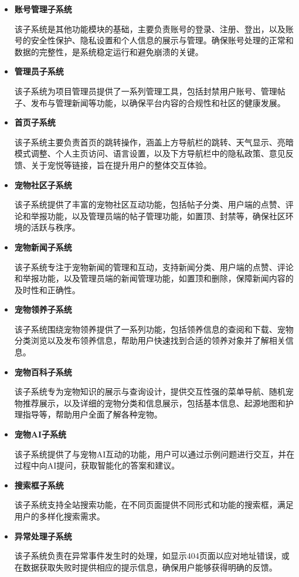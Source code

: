 \begin{itemize}
	\item \textbf{账号管理子系统}

	该子系统是其他功能模块的基础，主要负责账号的登录、注册、登出，以及账号的安全性保护、隐私设置和个人信息的展示与管理。确保账号处理的正常和数据的完整性，是系统稳定运行和避免崩溃的关键。

	\item \textbf{管理员子系统}

	该子系统为项目管理员提供了一系列管理工具，包括封禁用户账号、管理帖子、发布与管理新闻等功能，以确保平台内容的合规性和社区的健康发展。

	\item \textbf{首页子系统}

	该子系统主要负责首页的跳转操作，涵盖上方导航栏的跳转、天气显示、亮暗模式调整、个人主页访问、语言设置，以及下方导航栏中的隐私政策、意见反馈、关于宠悦等链接，旨在提升用户的整体交互体验。

	\item \textbf{宠物社区子系统}

	该子系统提供了丰富的宠物社区互动功能，包括帖子分类、用户端的点赞、评论和举报功能，以及管理员端的帖子管理功能，如置顶、封禁等，确保社区环境的活跃与秩序。

	\item \textbf{宠物新闻子系统}

	该子系统专注于宠物新闻的管理和互动，支持新闻分类、用户端的点赞、评论和举报功能，以及管理员端的新闻管理功能，如置顶和删除，保障新闻内容的及时性和正确性。

	\item \textbf{宠物领养子系统}

	该子系统围绕宠物领养提供了一系列功能，包括领养信息的查阅和下载、宠物分类浏览以及发布领养信息，帮助用户快速找到合适的领养对象并了解相关信息。

	\item \textbf{宠物百科子系统}

	该子系统专为宠物知识的展示与查询设计，提供交互性强的菜单导航、随机宠物推荐展示，以及详细的宠物分类和信息展示，包括基本信息、起源地图和护理指导等，帮助用户全面了解各种宠物。

	\item \textbf{宠物AI子系统}

	该子系统提供了与宠物AI互动的功能，用户可以通过示例问题进行交互，并在过程中向AI提问，获取智能化的答案和建议。

	\item \textbf{搜索框子系统}

	该子系统支持全站搜索功能，在不同页面提供不同形式和功能的搜索框，满足用户的多样化搜索需求。

	\item \textbf{异常处理子系统}

	该子系统负责在异常事件发生时的处理，如显示404页面以应对地址错误，或在数据获取失败时提供相应的提示信息，确保用户能够获得明确的反馈。
	
\end{itemize}